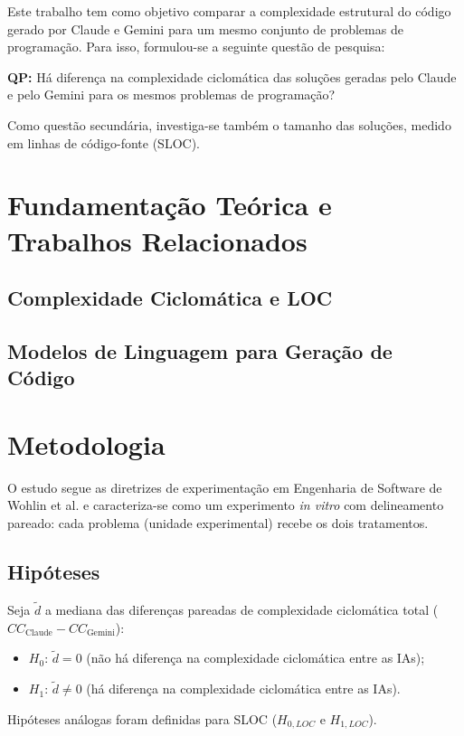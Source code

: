 \documentclass[12pt]{article}
\begin{document}
Este trabalho tem como objetivo comparar a complexidade estrutural do código gerado por
Claude e Gemini para um mesmo conjunto de problemas de programação. Para isso, formulou-se
a seguinte questão de pesquisa:

\textbf{QP:} Há diferença na complexidade ciclomática das soluções geradas pelo Claude e pelo
Gemini para os mesmos problemas de programação?

Como questão secundária, investiga-se também o tamanho das soluções, medido em linhas de
código-fonte (SLOC).

\section{Fundamentação Teórica e Trabalhos Relacionados}
\subsection{Complexidade Ciclomática e LOC}
\cite{mccabe1976}

\subsection{Modelos de Linguagem para Geração de Código}

\section{Metodologia}
O estudo segue as diretrizes de experimentação em Engenharia de Software de Wohlin et al.
\cite{wohlin2012} e caracteriza-se como um experimento \emph{in vitro} com
delineamento pareado: cada problema (unidade experimental) recebe os dois tratamentos.

\subsection{Hipóteses}
Seja $\tilde{d}$ a mediana das diferenças pareadas de complexidade ciclomática total
($CC_{\text{Claude}} - CC_{\text{Gemini}}$):
\begin{itemize}
  \item $H_0$: $\tilde{d} = 0$ (não há diferença na complexidade ciclomática entre as IAs);
  \item $H_1$: $\tilde{d} \neq 0$ (há diferença na complexidade ciclomática entre as IAs).
\end{itemize}
Hipóteses análogas foram definidas para SLOC ($H_{0,LOC}$ e $H_{1,LOC}$).
\end{document}
